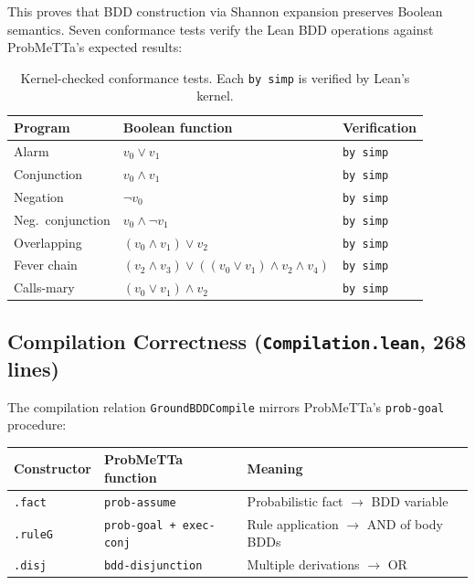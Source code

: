 \documentclass[11pt,a4paper]{article}
\theoremstyle{definition}
\begin{document}
This proves that BDD construction via Shannon expansion preserves Boolean
semantics. Seven conformance tests verify the Lean BDD operations against
ProbMeTTa's expected results:

\begin{table}[h]
\centering
\begin{tabular}{lll}
\toprule
\textbf{Program} & \textbf{Boolean function} & \textbf{Verification} \\
\midrule
Alarm & $v_0 \vee v_1$ & \texttt{by simp} \\
Conjunction & $v_0 \wedge v_1$ & \texttt{by simp} \\
Negation & $\neg v_0$ & \texttt{by simp} \\
Neg.~conjunction & $v_0 \wedge \neg v_1$ & \texttt{by simp} \\
Overlapping & $(v_0 \wedge v_1) \vee v_2$ & \texttt{by simp} \\
Fever chain & $(v_2 \wedge v_3) \vee ((v_0 \vee v_1) \wedge v_2 \wedge v_4)$ & \texttt{by simp} \\
Calls-mary & $(v_0 \vee v_1) \wedge v_2$ & \texttt{by simp} \\
\bottomrule
\end{tabular}
\caption{Kernel-checked conformance tests. Each \texttt{by simp} is verified by Lean's kernel.}
\end{table}

\subsection{Compilation Correctness (\texttt{Compilation.lean}, 268 lines)}

The compilation relation \texttt{GroundBDDCompile} mirrors ProbMeTTa's
\texttt{prob-goal} procedure:

\begin{center}
\begin{tabular}{lll}
\toprule
\textbf{Constructor} & \textbf{ProbMeTTa function} & \textbf{Meaning} \\
\midrule
\texttt{.fact} & \texttt{prob-assume} & Probabilistic fact $\to$ BDD variable \\
\texttt{.ruleG} & \texttt{prob-goal + exec-conj} & Rule application $\to$ AND of body BDDs \\
\texttt{.disj} & \texttt{bdd-disjunction} & Multiple derivations $\to$ OR \\
\bottomrule
\end{tabular}
\end{center}
\end{document}
